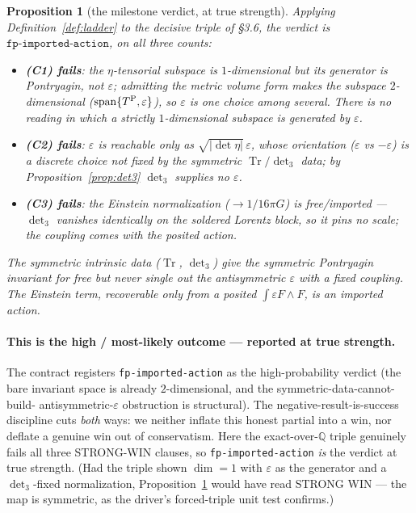 \documentclass[11pt]{article}
\newcommand{\Q}{\mathbb{Q}}
\newcommand{\Tr}{\operatorname{Tr}}
\theoremstyle{definition}\newtheorem{remark}{Remark}
\theoremstyle{definition}\newtheorem{definition}{Definition}
\theoremstyle{plain}\newtheorem{proposition}{Proposition}
\theoremstyle{plain}\newtheorem{lemma}{Lemma}
\begin{document}
\begin{proposition}[the milestone verdict, at true strength]\label{prop:verdict}
Applying Definition~\ref{def:ladder} to the decisive triple of \S3.6, the verdict is
$\boxed{\texttt{fp-imported-action}}$, on all three counts:
\begin{itemize}
\item \textbf{(C1) fails}: the $\eta$-tensorial subspace is $1$-dimensional but its
generator is \emph{Pontryagin}, not $\varepsilon$; admitting the metric volume form
makes the subspace $2$-dimensional ($\mathrm{span}\{T^{\rm P},\varepsilon\}$), so
$\varepsilon$ is one choice among several. There is no reading in which a strictly
$1$-dimensional subspace is generated by $\varepsilon$.
\item \textbf{(C2) fails}: $\varepsilon$ is reachable \emph{only} as
$\sqrt{|\det\eta|}\,\varepsilon$, whose orientation ($\varepsilon$ vs $-\varepsilon$) is
a discrete choice not fixed by the symmetric $\Tr/\det\nolimits_3$ data; by
Proposition~\ref{prop:det3} $\det\nolimits_3$ supplies no $\varepsilon$.
\item \textbf{(C3) fails}: the Einstein normalization ($\to 1/16\pi G$) is free/imported
--- $\det\nolimits_3$ vanishes identically on the soldered Lorentz block, so it pins no
scale; the coupling comes with the posited action.
\end{itemize}
The symmetric intrinsic data ($\Tr$, $\det\nolimits_3$) give the symmetric Pontryagin
invariant for free but never single out the antisymmetric $\varepsilon$ with a fixed
coupling. The Einstein term, recoverable only from a posited
$\int\varepsilon F\wedge F$, is an imported action.
\end{proposition}

\paragraph{This is the high / most-likely outcome --- reported at true strength.} The
contract registers \texttt{fp-imported-action} as the high-probability verdict (the
bare invariant space is already $2$-dimensional, and the symmetric-data-cannot-build-
antisymmetric-$\varepsilon$ obstruction is structural). The negative-result-is-success
discipline cuts \emph{both} ways: we neither inflate this honest partial into a win, nor
deflate a genuine win out of conservatism. Here the exact-over-$\Q$ triple genuinely
fails all three STRONG-WIN clauses, so \texttt{fp-imported-action} \emph{is} the verdict
at true strength. (Had the triple shown $\dim=1$ with $\varepsilon$ as the generator and
a $\det\nolimits_3$-fixed normalization, Proposition~\ref{prop:verdict} would have read
STRONG WIN --- the map is symmetric, as the driver's forced-triple unit test confirms.)
\end{document}
